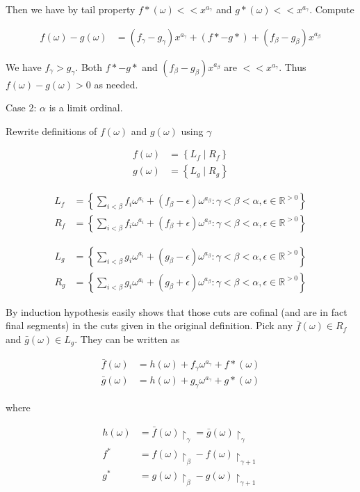 \documentclass{article}
\newcommand{\curly}[1]{\left\{ #1 \right\}}
\newcommand{\R}{\mathbb{R}}
\newcommand{\w}{\omega}
\newcommand{\midr}[1]{\restriction_{#1}}
\begin{document}
Then we have by tail property $f*(\omega) << x^{a_\gamma}$ and $g*(\omega) << x^{a_\gamma}$. Compute

\begin{align*}
  f(\w) - g(\w) &= (f_\gamma - g_\gamma) x^{a_\gamma} + (f* - g*) + (f_\beta - g_\beta) x^{a_\beta}
\end{align*}

We have $f_\gamma > g_\gamma$.
Both $f* - g*$ and $(f_\beta - g_\beta) x^{a_\beta}$ are  $<< x^{a_\gamma}$.
Thus $f(\w) - g(\w) > 0$ as needed.

Case 2: $\alpha$ is a limit ordinal.

Rewrite definitions of $f(\w)$ and $g(\w)$ using $\gamma$

\begin{align*}
  f(\w) &= \curly{L_f \mid R_f} \\
  g(\w) &= \curly{L_g \mid R_g}
\end{align*}

\begin{align*}
  L_f &= \curly{\sum_{i < \beta} f_i \w^{a_i} + (f_\beta - \epsilon) \w^{a_\beta}
	\colon \gamma < \beta < \alpha, \epsilon \in \R^{>0}} \\
  R_f &= \curly{\sum_{i < \beta} f_i \w^{a_i} + (f_\beta + \epsilon) \w^{a_\beta}
	\colon \gamma < \beta < \alpha, \epsilon \in \R^{>0}}
\end{align*}

\begin{align*}
  L_g &= \curly{\sum_{i < \beta} g_i \w^{a_i} + (g_\beta - \epsilon) \w^{a_\beta}
	\colon \gamma < \beta < \alpha, \epsilon \in \R^{>0}} \\
  R_g &= \curly{\sum_{i < \beta} g_i \w^{a_i} + (g_\beta + \epsilon) \w^{a_\beta}
	\colon \gamma < \beta < \alpha, \epsilon \in \R^{>0}}
\end{align*}

By induction hypothesis easily shows that those cuts are cofinal (and are in fact final segments) in the cuts given in the original definition. Pick any $\bar f(\w) \in R_f$ and $\bar g(\w) \in L_g$. They can be written as 

\begin{align*}
  \bar f(\w) &= h(\w) + f_\gamma \w^{a_\gamma} + f*(\w)\\
  \bar g(\w) &= h(\w) + g_\gamma \w^{a_\gamma} + g*(\w)
\end{align*}

where

\begin{align*}
	h(\w) &= \bar f(\w)\midr\gamma = \bar g(\w)\midr\gamma \\
	f^* &= f(\w)\midr\beta - f(\w)\midr{\gamma + 1} \\
	g^* &= g(\w)\midr\beta - g(\w)\midr{\gamma + 1}
\end{align*}
\end{document}
